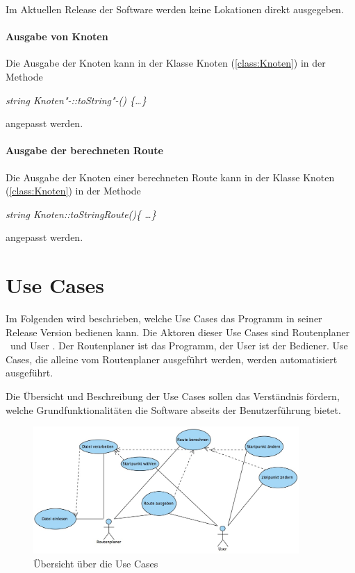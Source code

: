 \documentclass[12pt, a4paper, ngerman]{article}
\begin{document}
Im Aktuellen Release der Software werden keine Lokationen direkt ausgegeben. 

\paragraph{Ausgabe von Knoten}
Die Ausgabe der Knoten kann in der Klasse Knoten (\ref{class:Knoten}) in der Methode 

\textit{string Knoten"-::toString"-() \{\dots \}} 

angepasst werden.

\paragraph{Ausgabe der berechneten Route}
Die Ausgabe der Knoten einer berechneten Route kann in der Klasse Knoten (\ref{class:Knoten}) in der Methode 

\textit{string Knoten::toStringRoute()\{ \dots \}} 

angepasst werden.


\section{Use Cases}
Im Folgenden wird beschrieben, welche Use Cases das Programm in seiner Release Version bedienen kann. Die Aktoren dieser Use Cases sind \glqq Routenplaner \grqq~und \glqq User \grqq. Der Routenplaner ist das Programm, der User ist der Bediener. Use Cases, die alleine vom Routenplaner ausgeführt werden, werden automatisiert ausgeführt.

Die Übersicht und Beschreibung der Use Cases sollen das Verständnis fördern, welche Grundfunktionalitäten die Software abseits der Benutzerführung bietet.

\begin{figure}[htbp] 
  \centering
     \includegraphics[width=0.9\textwidth]{Grafiken/primaryUseCases.jpg}
  \caption{Übersicht über die Use Cases}
  \label{fig:uebersichtUseCases}
\end{figure}
\end{document}
